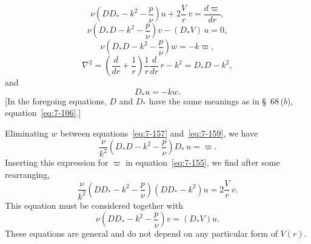 \begin{equation}
\label{eq:7-155}
\nu\!\left(DD_*-k^2-\frac{p}{\nu}\right)u
+ 2\frac{V}{r}\,v = \frac{d\varpi}{dr},
\end{equation}
\begin{equation}
\label{eq:7-156}
\nu\!\left(D_* D - k^2 - \frac{p}{\nu}\right)v - (D_*V)\,u = 0,
\end{equation}
\begin{equation}
\label{eq:7-157}
\nu\!\left(D_* D-k^2-\frac{p}{\nu}\right)w = -k\varpi,
\end{equation}
\begin{equation}
\label{eq:7-158}
\nabla^2 = \left(\frac{d}{dr}+\frac{1}{r}\right)\frac{1}{r}\frac{d}{dr}\, r - k^2
= D_* D - k^2,
\end{equation}
and
\begin{equation}
\label{eq:7-159}
D_* u = -kw.
\end{equation}
[In the foregoing equations, $D$ and $D_*$ have the same meanings as in
\S~68\,($b$), equation~\eqref{eq:7-106}.]

Eliminating $w$ between equations~\eqref{eq:7-157} and~\eqref{eq:7-159}, we have
\begin{equation}
\label{eq:7-160}
\frac{\nu}{k^2}\!\left(D_* D-k^2-\frac{p}{\nu}\right)D_*\,u = \varpi.
\end{equation}
Inserting this expression for $\varpi$ in equation~\eqref{eq:7-155}, we find after some
rearranging,
\begin{equation}
\label{eq:7-161}
\frac{\nu}{k^2}\!\left(DD_*-k^2-\frac{p}{\nu}\right)(DD_*-k^2)u
= 2\frac{V}{r}\,v.
\end{equation}
This equation must be considered together with
\begin{equation}
\label{eq:7-162}
\nu\!\left(DD_*-k^2-\frac{p}{\nu}\right)v = (D_*V)u.
\end{equation}
These equations are general and do not depend on any particular form
of $V(r)$.

